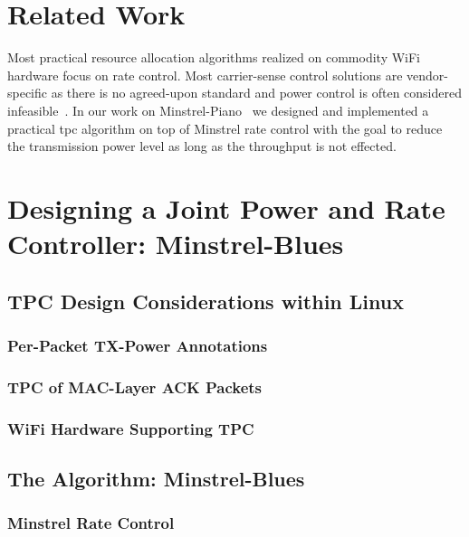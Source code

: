 \documentclass{sig-alternate}
\begin{document}
	\section{Related Work}
	\label{s:related}
	Most practical resource allocation algorithms realized on commodity
	WiFi hardware focus on rate control. Most carrier-sense control solutions
	are vendor-specific as there is no agreed-upon standard and power
	control is often considered infeasible~\cite{abdesslem_feasibility_2006,
	shrivastava_feasibility_2007,shrivastava_understanding_2007}.
	In our work on Minstrel-Piano~\cite{Huehn_ICCCN_2012} we designed and
	implemented a practical tpc algorithm on top of Minstrel rate control
	with the goal to reduce the transmission power level as long as the
	throughput is not effected.

	\section{Designing a Joint Power and Rate Controller: Minstrel-Blues}
	\label{s:design} 

	\subsection{TPC Design Considerations within Linux}

	\subsubsection{Per-Packet TX-Power Annotations}
	\label{s:power-annotation}

	\subsubsection{TPC of MAC-Layer ACK Packets}
	\label{s:ack-packets}

	\subsubsection{WiFi Hardware Supporting TPC}
	\label{s:hardware}

	\subsection{The Algorithm: Minstrel-Blues}
	\label{s:minstrel-blues}

	\subsubsection{Minstrel Rate Control}
	\label{s:minstrel}
\end{document}
